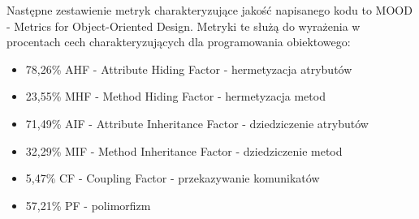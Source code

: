 Następne zestawienie metryk charakteryzujące jakość napisanego kodu to MOOD - Metrics for Object-Oriented Design. Metryki te służą do wyrażenia w procentach cech charakteryzujących dla programowania obiektowego:
\begin{itemize}
 \item 78,26\% AHF - Attribute Hiding Factor - hermetyzacja atrybutów
 \item 23,55\% MHF - Method Hiding Factor - hermetyzacja metod
 \item 71,49\% AIF - Attribute Inheritance Factor - dziedziczenie atrybutów
 \item 32,29\% MIF - Method Inheritance Factor - dziedziczenie metod
 \item 5,47\% CF - Coupling Factor - przekazywanie komunikatów 
 \item 57,21\% PF - polimorfizm
\end{itemize}

